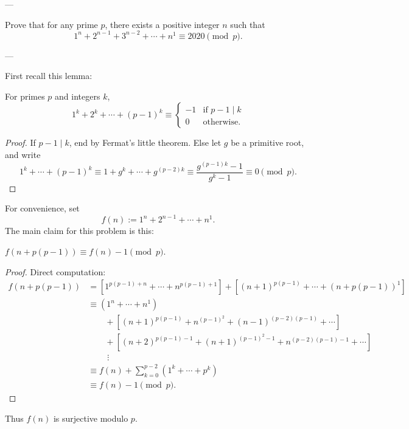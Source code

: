 
---

Prove that for any prime $p$, there exists a positive integer $n$ such that
\[1^n+2^{n-1}+3^{n-2}+\cdots+n^1\equiv2020\pmod p.\]

---

First recall this lemma:
\begin{lemma*}
    For primes $p$ and integers $k$,
    \[1^k+2^k+\cdots+(p-1)^k\equiv\begin{cases}-1&\text{if }p-1\mid k\\0&\text{otherwise.}\end{cases}\]
\end{lemma*}
\begin{proof}
    If $p-1\mid k$, end by Fermat's little theorem. Else let $g$ be a primitive root, and write \[1^k+\cdots+(p-1)^k\equiv1+g^k+\cdots+g^{(p-2)k}\equiv\frac{g^{(p-1)k}-1}{g^k-1}\equiv0\pmod p.\]
\end{proof}

For convenience, set
\[f(n):=1^n+2^{n-1}+\cdots+n^1.\]
The main claim for this problem is this:
\begin{claim*}
    $f(n+p(p-1))\equiv f(n)-1\pmod p$.
\end{claim*}
\begin{proof}
    Direct computation:
    \begin{align*}
        f(n+p(p-1))&=\left[1^{p(p-1)+n}+\cdots+n^{p(p-1)+1}\right]+\left[(n+1)^{p(p-1)}+\cdots+(n+p(p-1))^1\right]\\
        &\equiv\left(1^n+\cdots+n^1\right)\\
        &\qquad+\left[(n+1)^{p(p-1)}+n^{(p-1)^2}+(n-1)^{(p-2)(p-1)}+\cdots\right]\\
        &\qquad+\left[(n+2)^{p(p-1)-1}+(n+1)^{(p-1)^2-1}+n^{(p-2)(p-1)-1}+\cdots\right]\\
        &\qquad\;\vdots\\
        &\equiv f(n)+\sum_{k=0}^{p-2}\left(1^k+\cdots+p^k\right)\\
        &\equiv f(n)-1\pmod p.
    \end{align*}
\end{proof}

Thus $f(n)$ is surjective modulo $p$.

